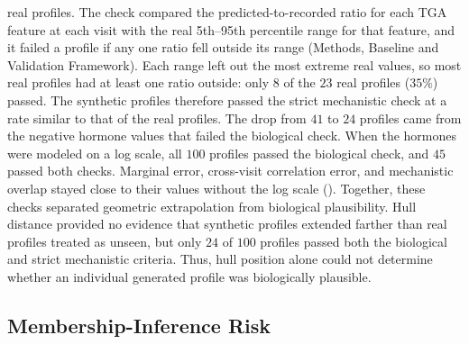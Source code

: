 real profiles. The check compared the predicted-to-recorded ratio for each TGA feature at each
visit with the real 5th--95th percentile range for that feature, and it failed a profile if any
one ratio fell outside its range (Methods, Baseline and Validation Framework). Each range left
out the most extreme real values, so most real profiles had at least one ratio outside: only
$8$ of the $23$ real profiles ($35\%$) passed. The synthetic profiles therefore
passed the strict mechanistic check at a rate similar to that of the real profiles. The drop
from $41$ to $24$ profiles came from the negative hormone values that failed the biological
check. When the hormones were modeled on a log scale, all $100$ profiles
passed the biological check, and $45$ passed both checks. Marginal error, cross-visit
correlation error, and mechanistic overlap stayed close to their values without the log scale
(). Together, these checks
separated geometric extrapolation from biological plausibility. Hull distance provided no
evidence that synthetic profiles extended farther than real profiles treated as unseen, but
only $24$ of $100$ profiles passed both the biological and strict mechanistic criteria. Thus,
hull position alone could not determine whether an individual generated profile was
biologically plausible.

\subsection{Membership-Inference Risk}

